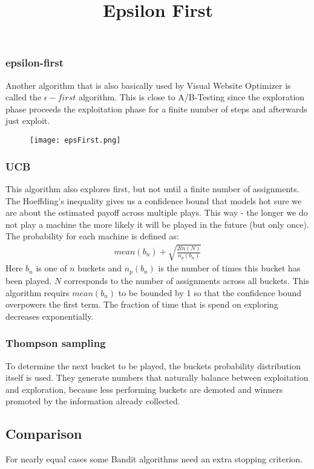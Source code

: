 \documentclass[main.tex]{subfiles}
\begin{document}
\subsubsection{epsilon-first}
Another algorithm that is also basically used by Visual Website Optimizer is called the $\epsilon-first$ algorithm. This is close to A/B-Testing since the exploration phase proceeds the exploitation phase for a finite number of steps and afterwards just exploit.
\begin{figure}[ht]
\texttt{[image: epsFirst.png]}
\centering
\title{Epsilon First}
\end{figure}
\subsubsection{UCB}
This algorithm also explores first, but not until a finite number of assignments. The Hoeffding's inequality gives us a confidence bound that models hot sure we are about the estimated payoff across multiple plays. This way - the longer we do not play a machine the more likely it will be played in the future (but only once). The probability for each machine is defined as:
\begin{align*}
mean(b_n) + \sqrt{\frac{2ln(N)}{n_p(b_n)}}
\end{align*}
Here $b_n$ is one of $n$ buckets and $n_p(b_n)$ is the number of times this bucket has been played. $N$ corresponds to the number of assignments across all buckets. This algorithm requirs $mean(b_n)$ to be bounded by 1 so that the confidence bound overpowers the first term. The fraction of time that is spend on exploring decreases exponentially.
\subsubsection{Thompson sampling}
To determine the next bucket to be played, the buckets probability distribution itself is used. They generate numbers that naturally balance between exploitation and exploration, because less performing buckets are demoted and winners promoted by the information already collected.
\subsection{Comparison}
For nearly equal cases some Bandit algorithms need an extra stopping criterion.
\end{document}
